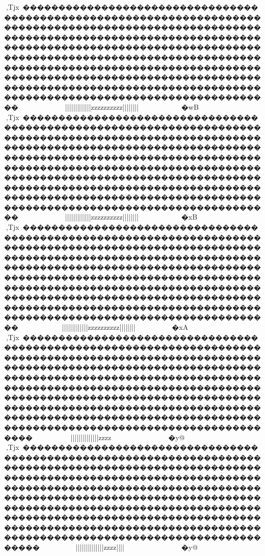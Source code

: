 {{{{{{{{{{{{{{{{{{{{{{{{{{{{{{{{{{{{{{{{{{{{{{{{{{{{{{{{{{{{{{{{{{{{{{{{{{{{{{{{{{{{{{{{{{{{{{{{{{{{{{{{{{{{{{{{{{{{{{{{{{{{{{{{{{{{{{{{{{{{{{{{{{{{{{{{{{{{{{{{{{{{{{{{{{{{{{{{{{{{{{{{{{{{{{{{{{{{{{{{{{{{{{{{{{{{{{{{{{{{{{{{{{{{{{{{{{{{{{{{{{{{,Tjx~�����������������������������������������������������������������������������������������������������������������������������������������������������������������������������������������������������������������������������������������������������������������������������������������������������������������������������������������������������������������������~~~~~~~~~~~~}}}}}||}||||{{{{{{{{{{{{{{{{{{{{||||{{{{{{{{|||{{{zzzzzzzzzz{{||||}}||||}}}}~~~~~~~~~~~~�wB
,Tjx~�����������������������������������������������������������������������������������������������������������������������������������������������������������������������������������������������������������������������������������������������������������������������������������������������������������������������������������������������������������������������~~~~~~~~~~~~}}}}}||}||||{{{{{{{{{{{{{{{{{{{{||||{{{{{{{{|||{{{zzzzzzzzzz{{{{||||||||}}}}~~~~~~~~~~~~�xB
,Tjx~�����������������������������������������������������������������������������������������������������������������������������������������������������������������������������������������������������������������������������������������������������������������������������������������������������������������������������������������������������������������������~~~~~~~~~~}}}}}||}||||{{{{{{{{{{{{{{{{{{{{||||{{{{{{{{|||{{{zzzzzzzzzz{{{{||||||||}}}}~~~~~~~~�xA
,Tjx~�������������������������������������������������������������������������������������������������������������������������������������������������������������������������������������������������������������������������������������������������������������������������������������������������������������������������������������������������������������������������~~~~~~~~~}}}}}||}||||{{{{{{{{{{{{{{{{{{{{||||{{{{{{{{||||{{{{{{{{zzzz{{{{{{{{}}}}~~~~~~~~~~~~~~~~�y@
,Tjx~��������������������������������������������������������������������������������������������������������������������������������������������������������������������������������������������������������������������������������������������������������������������������������������������������������������������������������������������������������������������������~~~~~~~~~}}}}}||}||||{{{{{{{{{{{{{{{{{{{{||||{{{{{{{{||||{{{{{{{{zzzz{{{{||||}}}}~~~~~~~~~~~~~~~~�y@
}}}}}}}}}}}}}}}}}}}}}}}}}}}}}}}}}}}}}}}}}}}}}}}}}}}}}}}}}}}}}}}}}}}}}}}}}}}}}}}}}}}}}}}}}}}}}}}}}}}}}}}}}}}}}}}}}}}}}}}}}}}}}}}}}}}}}}}}}}}}}}}}}}}}}}}}}}}}}}}}}}}}}}}}}}}}}}}}}}}}}}}}}}}}}}}}}}}}}}}}}}}}}}}}}}}}}}}}}}}}}}}}}}}}}}}}}}}}}}}}}}}}}}}}}}}}}}}}}}}}}}}}}}}}}}}}}}}}}}}}}}}}}}}}}}}}}}}}}}}}}}}}}}}}}}}}}}}}}}}}}}}}}}}}}}}}}}}}}}}}}}}}}}}}}}}}}}}}}}}}}}}}}}}}}}}}}}}}}}}
